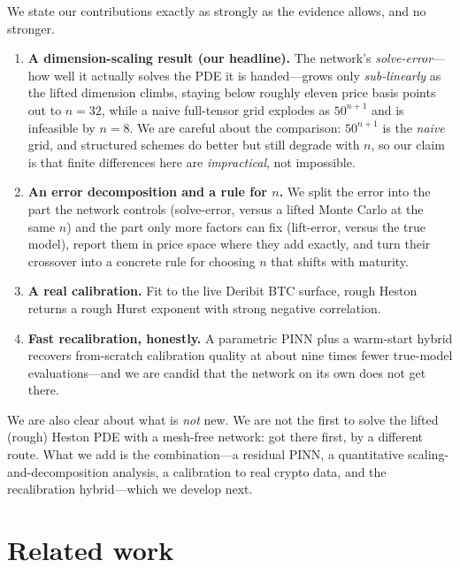 \documentclass[11pt]{article}
\begin{document}
We state our contributions exactly as strongly as the evidence allows, and no
stronger.
\begin{enumerate}
\item \textbf{A dimension-scaling result (our headline).} The network's
\emph{solve-error}---how well it actually solves the PDE it is handed---grows only
\emph{sub-linearly} as the lifted dimension climbs, staying below roughly eleven
price basis points out to $n=32$, while a naive full-tensor grid explodes as
$50^{n+1}$ and is infeasible by $n=8$. We are careful about the comparison:
$50^{n+1}$ is the \emph{naive} grid, and structured schemes do better but still
degrade with $n$, so our claim is that finite differences here are
\emph{impractical}, not impossible.
\item \textbf{An error decomposition and a rule for $n$.} We split the error into
the part the network controls (solve-error, versus a lifted Monte Carlo at the
same $n$) and the part only more factors can fix (lift-error, versus the true
model), report them in price space where they add exactly, and turn their
crossover into a concrete rule for choosing $n$ that shifts with maturity.
\item \textbf{A real calibration.} Fit to the live Deribit BTC surface, rough
Heston returns a rough Hurst exponent with strong negative correlation.
\item \textbf{Fast recalibration, honestly.} A parametric PINN plus a warm-start
hybrid recovers from-scratch calibration quality at about nine times fewer
true-model evaluations---and we are candid that the network on its own does not
get there.
\end{enumerate}

We are also clear about what is \emph{not} new. We are not the first to solve the
lifted (rough) Heston PDE with a mesh-free network: \citet{papapantoleon2025timestepping}
got there first, by a different route. What we add is the combination---a residual
PINN, a quantitative scaling-and-decomposition analysis, a calibration to real
crypto data, and the recalibration hybrid---which we develop next.

\section{Related work}
\end{document}
